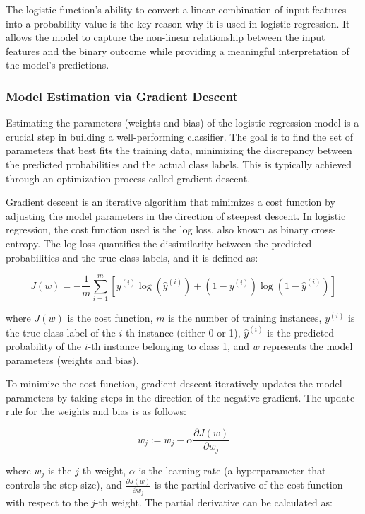 \documentclass[letterpaper,10pt]{article}
\begin{document}
The logistic function's ability to convert a linear combination of input features into a probability value is the key reason why it is used in logistic regression. It allows the model to capture the non-linear relationship between the input features and the binary outcome while providing a meaningful interpretation of the model's predictions. \par

\subsubsection{Model Estimation via Gradient Descent}
Estimating the parameters (weights and bias) of the logistic regression model is a crucial step in building a well-performing classifier. The goal is to find the set of parameters that best fits the training data, minimizing the discrepancy between the predicted probabilities and the actual class labels. This is typically achieved through an optimization process called gradient descent. \par

Gradient descent is an iterative algorithm that minimizes a cost function by adjusting the model parameters in the direction of steepest descent. In logistic regression, the cost function used is the log loss, also known as binary cross-entropy. The log loss quantifies the dissimilarity between the predicted probabilities and the true class labels, and it is defined as:

\[ J(w) = -\frac{1}{m} \sum_{i=1}^{m} [y^{(i)} \log(\hat{y}^{(i)}) + (1 - y^{(i)}) \log(1 - \hat{y}^{(i)})] \]

where $J(w)$ is the cost function, $m$ is the number of training instances, $y^{(i)}$ is the true class label of the $i$-th instance (either 0 or 1), $\hat{y}^{(i)}$ is the predicted probability of the $i$-th instance belonging to class 1, and $w$ represents the model parameters (weights and bias). \par

To minimize the cost function, gradient descent iteratively updates the model parameters by taking steps in the direction of the negative gradient. The update rule for the weights and bias is as follows:

\[ w_j := w_j - \alpha \frac{\partial J(w)}{\partial w_j} \]

where $w_j$ is the $j$-th weight, $\alpha$ is the learning rate (a hyperparameter that controls the step size), and $\frac{\partial J(w)}{\partial w_j}$ is the partial derivative of the cost function with respect to the $j$-th weight. The partial derivative can be calculated as:
\end{document}
